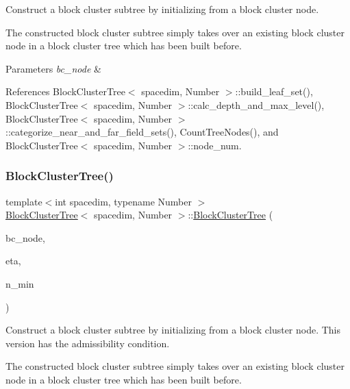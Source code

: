 Construct a block cluster subtree by initializing from a block cluster node.

The constructed block cluster subtree simply takes over an existing block cluster node in a block cluster tree which has been built before.


\begin{DoxyParams}{Parameters}
{\em bc\+\_\+node} & \\
\hline
\end{DoxyParams}


References Block\+Cluster\+Tree$<$ spacedim, Number $>$\+::build\+\_\+leaf\+\_\+set(), Block\+Cluster\+Tree$<$ spacedim, Number $>$\+::calc\+\_\+depth\+\_\+and\+\_\+max\+\_\+level(), Block\+Cluster\+Tree$<$ spacedim, Number $>$\+::categorize\+\_\+near\+\_\+and\+\_\+far\+\_\+field\+\_\+sets(), Count\+Tree\+Nodes(), and Block\+Cluster\+Tree$<$ spacedim, Number $>$\+::node\+\_\+num.

\mbox{\label{classBlockClusterTree_a522ad51298f5b58b948e435a9e2d2a40}} 
\subsubsection{\texorpdfstring{Block\+Cluster\+Tree()}{BlockClusterTree()}\hspace{0.1cm}{\footnotesize\ttfamily [5/8]}}
{\footnotesize\ttfamily template$<$int spacedim, typename Number $>$ \\
\hyperlink{classBlockClusterTree}{Block\+Cluster\+Tree}$<$ spacedim, Number $>$\+::\hyperlink{classBlockClusterTree}{Block\+Cluster\+Tree} (\begin{DoxyParamCaption}\item[{\hyperlink{classTreeNode}{node\+\_\+pointer\+\_\+type}}]{bc\+\_\+node,  }\item[{const Number}]{eta,  }\item[{const unsigned int}]{n\+\_\+min }\end{DoxyParamCaption})}

Construct a block cluster subtree by initializing from a block cluster node. This version has the admissibility condition.

The constructed block cluster subtree simply takes over an existing block cluster node in a block cluster tree which has been built before.


